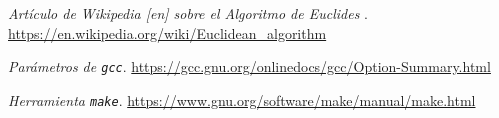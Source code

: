 \documentclass[titlepage,a4paper]{article}
\begin{document}
\newpage
\begin{thebibliography}{9}

\cprotect\textit{Artículo de Wikipedia [en] sobre el Algoritmo de Euclides }. 
\href {https://en.wikipedia.org/wiki/Euclidean_algorithm}{
https://en.wikipedia.org/wiki/Euclidean_algorithm
}

\cprotect\textit{Parámetros de \verb|gcc|}. 
\href {https://gcc.gnu.org/onlinedocs/gcc/Option-Summary.html}{
https://gcc.gnu.org/onlinedocs/gcc/Option-Summary.html
}

\cprotect\textit{Herramienta \verb|make|}. 
\href {https://www.gnu.org/software/make/manual/make.html}{
https://www.gnu.org/software/make/manual/make.html
}



\end{thebibliography}
\end{document}
